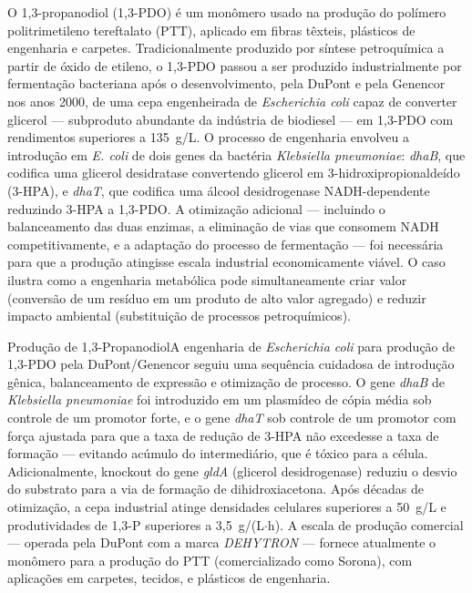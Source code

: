 O 1,3-propanodiol (1,3-PDO) é um monômero usado na produção do polímero politrimetileno tereftalato (PTT), aplicado em fibras têxteis, plásticos de engenharia e carpetes. Tradicionalmente produzido por síntese petroquímica a partir de óxido de etileno, o 1,3-PDO passou a ser produzido industrialmente por fermentação bacteriana após o desenvolvimento, pela DuPont e pela Genencor nos anos 2000, de uma cepa engenheirada de \textit{Escherichia coli} capaz de converter glicerol --- subproduto abundante da indústria de biodiesel --- em 1,3-PDO com rendimentos superiores a 135~g/L. O processo de engenharia envolveu a introdução em \textit{E. coli} de dois genes da bactéria \textit{Klebsiella pneumoniae}: \textit{dhaB}, que codifica uma glicerol desidratase convertendo glicerol em 3-hidroxipropionaldeído (3-HPA), e \textit{dhaT}, que codifica uma álcool desidrogenase NADH-dependente reduzindo 3-HPA a 1,3-PDO. A otimização adicional --- incluindo o balanceamento das duas enzimas, a eliminação de vias que consomem NADH competitivamente, e a adaptação do processo de fermentação --- foi necessária para que a produção atingisse escala industrial economicamente viável. O caso ilustra como a engenharia metabólica pode simultaneamente criar valor (conversão de um resíduo em um produto de alto valor agregado) e reduzir impacto ambiental (substituição de processos petroquímicos).

\begin{exemplo}{Produção de 1,3-Propanodiol}{A engenharia de \textit{Escherichia coli} para produção de 1,3-PDO pela DuPont/Genencor seguiu uma sequência cuidadosa de introdução gênica, balanceamento de expressão e otimização de processo. O gene \textit{dhaB} de \textit{Klebsiella pneumoniae} foi introduzido em um plasmídeo de cópia média sob controle de um promotor forte, e o gene \textit{dhaT} sob controle de um promotor com força ajustada para que a taxa de redução de 3-HPA não excedesse a taxa de formação --- evitando acúmulo do intermediário, que é tóxico para a célula. Adicionalmente, knockout do gene \textit{gldA} (glicerol desidrogenase) reduziu o desvio do substrato para a via de formação de dihidroxiacetona. Após décadas de otimização, a cepa industrial atinge densidades celulares superiores a 50~g/L e produtividades de 1,3-P superiores a 3,5~g/(L$\cdot$h). A escala de produção comercial --- operada pela DuPont com a marca \textit{DEHYTRON} --- fornece atualmente o monômero para a produção do PTT (comercializado como Sorona), com aplicações em carpetes, tecidos, e plásticos de engenharia.}
\end{exemplo}

